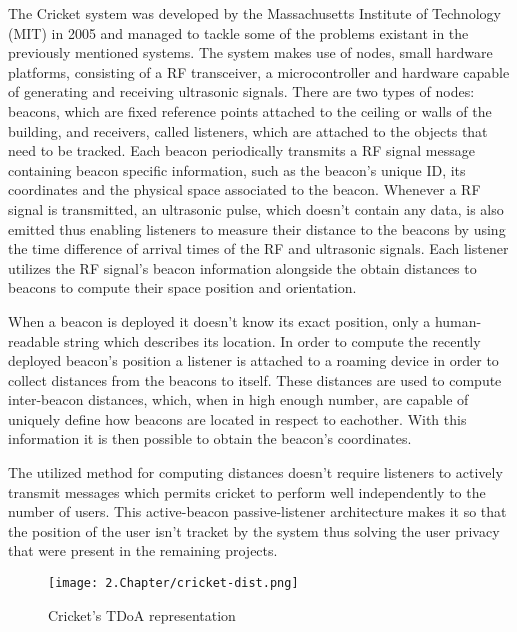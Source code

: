 \label{subsec:cricket}

The Cricket system \cite{cricket}was developed by the Massachusetts Institute of Technology (MIT) in 2005 and managed to tackle some of the problems existant in the previously mentioned systems. The system makes use of nodes, small hardware platforms, consisting of a RF transceiver, a microcontroller and hardware capable of generating and receiving ultrasonic signals. There are two types of nodes: beacons, which are fixed reference points attached to the ceiling or walls of the building, and receivers, called listeners, which are attached to the objects that need to be tracked. Each beacon periodically transmits a \ac{RF} signal message containing beacon specific information, such as the beacon's unique ID, its coordinates and the physical space associated to the beacon. Whenever a \ac{RF} signal is transmitted, an ultrasonic pulse, which doesn't contain any data, is also emitted thus enabling listeners to measure their distance to the beacons by using the time difference of arrival times of the RF and ultrasonic signals. Each listener utilizes the RF signal's beacon information alongside the obtain distances to beacons to compute their space position and orientation. 

When a beacon is deployed it doesn't know its exact position, only a human-readable string which describes its location. In order to compute the recently deployed beacon's position a listener is attached to a roaming device in order to collect distances from the beacons to itself. These distances are used to compute inter-beacon distances, which, when in high enough number, are capable of uniquely define how beacons are located in respect to eachother. With this information it is then possible to obtain the beacon's coordinates.

The utilized method for computing distances doesn't require listeners to actively transmit messages which permits cricket to perform well independently to the number of users. This active-beacon passive-listener architecture makes it so that the position of the user isn't tracket by the system thus solving the user privacy that were present in the remaining projects.

\begin{figure}[H]
	\centering
		\texttt{[image: 2.Chapter/cricket-dist.png]}
	\caption[Cricket's \ac{TDoA} representation]{Cricket's \ac{TDoA} representation}
	\label{fig:cricket-tdoa}
\end{figure}

